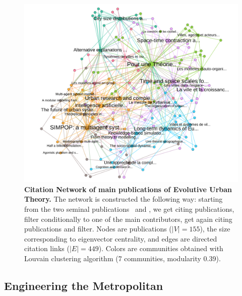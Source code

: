 \documentclass[runningheads,a4paper]{llncs2e/llncs}
\begin{document}
\begin{figure}[h!]
\hspace{-4cm}
\includegraphics[width=1.5\textwidth]{figures/core}
\caption{\textbf{Citation Network of main publications of Evolutive Urban Theory.} The network is constructed the following way: starting from the two seminal publications~\cite{pumain1997pour} and \cite{sanders1997simpop}, we get citing publications, filter conditionally to one of the main contributors, get again citing publications and filter. Nodes are publications ($\left|V\right|=155$), the size corresponding to eigenvector centrality, and edges are directed citation links ($\left|E\right|=449$). Colors are communities obtained with Louvain clustering algorithm (7 communities, modularity 0.39).}
\label{fig:citnw}
\end{figure}




\subsection{Engineering the Metropolitan}
\end{document}
